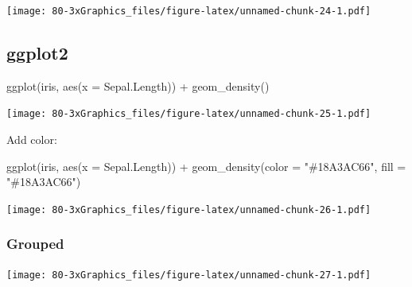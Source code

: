\documentclass[
]{book}
\newenvironment{Shaded}{\begin{snugshade}}{\end{snugshade}}
\newcommand{\AttributeTok}[1]{\textcolor[rgb]{0.77,0.63,0.00}{#1}}
\newcommand{\FunctionTok}[1]{\textcolor[rgb]{0.00,0.00,0.00}{#1}}
\newcommand{\NormalTok}[1]{#1}
\newcommand{\SpecialCharTok}[1]{\textcolor[rgb]{0.00,0.00,0.00}{#1}}
\newcommand{\StringTok}[1]{\textcolor[rgb]{0.31,0.60,0.02}{#1}}
\begin{document}
\texttt{[image: 80-3xGraphics\_files/figure-latex/unnamed-chunk-24-1.pdf]}

\hypertarget{ggplot2-3}{%
\subsection{\texorpdfstring{\textbf{ggplot2}}{ggplot2}}\label{ggplot2-3}}

\begin{Shaded}
\begin{Highlighting}[]
\FunctionTok{ggplot}\NormalTok{(iris, }\FunctionTok{aes}\NormalTok{(}\AttributeTok{x =}\NormalTok{ Sepal.Length)) }\SpecialCharTok{+} \FunctionTok{geom\_density}\NormalTok{()}
\end{Highlighting}
\end{Shaded}

\texttt{[image: 80-3xGraphics\_files/figure-latex/unnamed-chunk-25-1.pdf]}

Add color:

\begin{Shaded}
\begin{Highlighting}[]
\FunctionTok{ggplot}\NormalTok{(iris, }\FunctionTok{aes}\NormalTok{(}\AttributeTok{x =}\NormalTok{ Sepal.Length)) }\SpecialCharTok{+} \FunctionTok{geom\_density}\NormalTok{(}\AttributeTok{color =} \StringTok{"\#18A3AC66"}\NormalTok{, }\AttributeTok{fill =} \StringTok{"\#18A3AC66"}\NormalTok{)}
\end{Highlighting}
\end{Shaded}

\texttt{[image: 80-3xGraphics\_files/figure-latex/unnamed-chunk-26-1.pdf]}

\hypertarget{grouped-1}{%
\subsubsection{Grouped}\label{grouped-1}}

\begin{Shaded}
\end{Shaded}

\texttt{[image: 80-3xGraphics\_files/figure-latex/unnamed-chunk-27-1.pdf]}

\begin{Shaded}
\end{Shaded}
\end{document}
